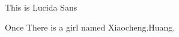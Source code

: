 \documentclass[UTF8]{ctexart}
\begin{document}
	{
		\lucidasans This is Lucida Sans
	}
		
 
		
	Once There is a girl named Xiaocheng.Huang.
	
\end{document}
